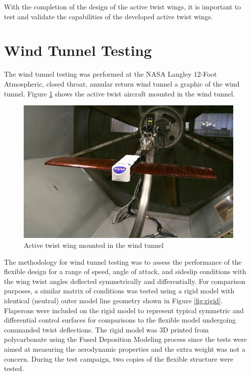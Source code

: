 \documentclass[11pt]{ucthesis}
\begin{document}
With the completion of the design of the active twist wings, it is important to test and validate the capabilities of the developed active twist wings.

\section{Wind Tunnel Testing}
The wind tunnel testing was performed at the NASA Langley 12-Foot Atmospheric, closed throat, annular return wind tunnel a graphic of the wind tunnel. Figure \ref{fig:flex} shows the active twist aircraft mounted in the wind tunnel.


\begin{figure}[thpb]
\centering
\includegraphics[width=0.65\linewidth]{Figures/wingFlex.png}
\caption{Active twist wing mounted in the wind tunnel}
\label{fig:flex}
\end{figure}

The methodology for wind tunnel testing was to assess the performance of the flexible design for a range of speed, angle of attack, and sideslip conditions with the wing twist angles deflected symmetrically and differentially. For comparison purposes, a similar matrix of conditions was tested using a rigid model with identical (neutral) outer model line geometry shown in Figure \ref{fig:rigid}. Flaperons were included on the rigid model to represent typical symmetric and differential control surfaces for comparisons to the flexible model undergoing commanded twist deflections. The rigid model was 3D printed from polycarbonate using the Fused Deposition Modeling process since the tests were aimed at measuring the aerodynamic properties and the extra weight was not a concern. During the test campaign, two copies of the flexible structure were tested.
\end{document}
